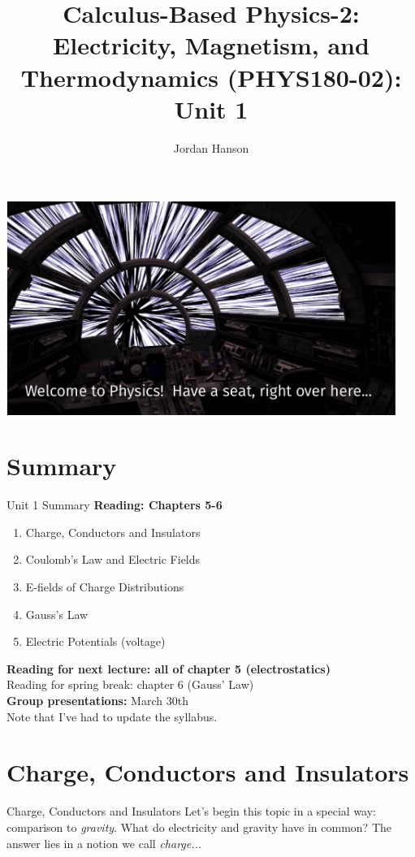 \documentclass{beamer}
\title{Calculus-Based Physics-2: Electricity, Magnetism, and Thermodynamics (PHYS180-02): Unit 1}
\author{Jordan Hanson}
\institute{Whittier College Department of Physics and Astronomy}
\begin{document}
\maketitle

\begin{frame}
\centering
\includegraphics[width=0.95\textwidth]{figures/hyper.pdf}
\end{frame}

\section{Summary}

\begin{frame}{Unit 1 Summary}
\textbf{Reading: Chapters 5-6}
\begin{enumerate}
\item Charge, Conductors and Insulators
\item Coulomb's Law and Electric Fields
\item E-fields of Charge Distributions
\item Gauss's Law
\item Electric Potentials (voltage)
\end{enumerate}
\textbf{Reading for next lecture: all of chapter 5 (electrostatics)} \\ 
\alert{Reading for spring break: chapter 6 (Gauss' Law)} \\
\alert{\textbf{Group presentations:} March 30th} \\
Note that I've had to update the syllabus.
\end{frame}

\section{Charge, Conductors and Insulators}

\begin{frame}{Charge, Conductors and Insulators}
Let's begin this topic in a special way: comparison to \textit{gravity}.  What do electricity and gravity have in common?  The answer lies in a notion we call \textit{charge...}
\end{frame}
\end{document}
